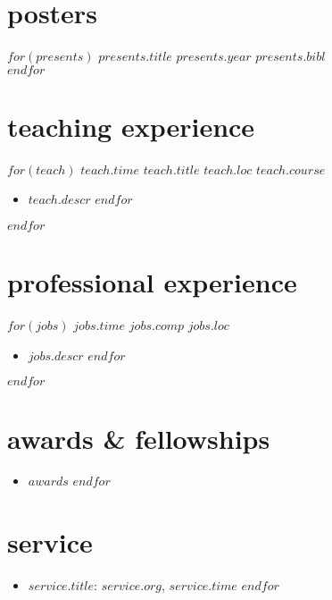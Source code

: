 \documentclass[]{friggeri-cv}
\begin{document}
\section{posters}
\begin{entrylist}
$for(presents)$
  \entrypub
  {$presents.title$}
  {$presents.year$}
  {$presents.bibl$}\\
$endfor$
\end{entrylist}



\section{teaching experience}
\begin{entrylist}
$for(teach)$
  \entry
  {$teach.time$}
  {$teach.title$}
  {$teach.loc$}
  {$teach.course$}
  \setlength\parskip{0pt}
  \begin{itemize}[noitemsep, leftmargin=0.2in]
    $for(teach.descr)$
      \item $teach.descr$
    $endfor$
  \end{itemize}
  \setlength\parskip{12pt}
$endfor$
\end{entrylist}

\section{professional experience}
\begin{entrylist}
$for(jobs)$
  \entryalt
  {$jobs.time$}
  {$jobs.comp$}
  {$jobs.loc$}
  \setlength\parskip{0pt}
  \begin{itemize}[noitemsep, leftmargin=0.2in]
    $for(jobs.descr)$
      \item $jobs.descr$
    $endfor$
  \end{itemize}
  \setlength\parskip{12pt}
$endfor$
\end{entrylist}



\section{awards \& fellowships}
\begin{itemize}[noitemsep, leftmargin=0.55in]
$for(awards)$
  \item $awards$
$endfor$
\end{itemize}



\section{service}
\begin{itemize}[noitemsep, leftmargin=0.55in]
$for(service)$
  \item $service.title$: $service.org$, $service.time$ 
$endfor$
\end{itemize}
\end{document}
